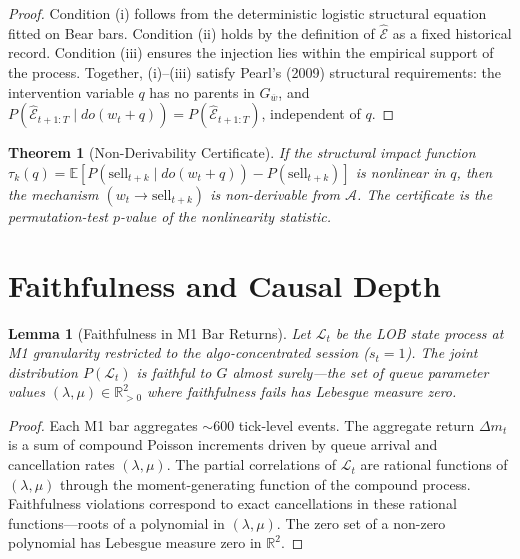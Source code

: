\documentclass[12pt]{article}
\newtheorem{theorem}{Theorem}
\newtheorem{lemma}{Lemma}
\begin{document}
\begin{proof}
Condition (i) follows from the deterministic logistic structural
equation fitted on Bear bars.
Condition (ii) holds by the definition of $\hat{\mathcal{E}}$ as a
fixed historical record.
Condition (iii) ensures the injection lies within the empirical
support of the process.
Together, (i)--(iii) satisfy Pearl's (2009) structural requirements:
the intervention variable $q$ has no parents in $G_{\overline{w}}$,
and $P(\hat{\mathcal{E}}_{t+1:T} \mid do(w_t + q)) =
P(\hat{\mathcal{E}}_{t+1:T})$, independent of $q$.
\end{proof}

\begin{theorem}[Non-Derivability Certificate]
\label{thm:certificate}
If the structural impact function
$\tau_k(q) = \mathbb{E}[P(\text{sell}_{t+k} \mid do(w_t + q))
- P(\text{sell}_{t+k})]$
is nonlinear in $q$, then the mechanism
$(w_t \to \text{sell}_{t+k})$ is non-derivable from $\mathcal{A}$.
The certificate is the permutation-test $p$-value of the
nonlinearity statistic.
\end{theorem}

\section{Faithfulness and Causal Depth}
\label{sec:faithfulness}

\begin{lemma}[Faithfulness in M1 Bar Returns]
\label{lem:faithfulness}
Let $\mathcal{L}_t$ be the LOB state process at M1 granularity
restricted to the algo-concentrated session ($s_t = 1$).
The joint distribution $P(\mathcal{L}_t)$ is faithful to $G$
almost surely---the set of queue parameter values
$(\lambda, \mu) \in \mathbb{R}^2_{>0}$ where faithfulness fails
has Lebesgue measure zero.
\end{lemma}

\begin{proof}
Each M1 bar aggregates $\sim$600 tick-level events.
The aggregate return $\Delta m_t$ is a sum of compound Poisson
increments driven by queue arrival and cancellation rates
$(\lambda, \mu)$.
The partial correlations of $\mathcal{L}_t$ are rational functions
of $(\lambda, \mu)$ through the moment-generating function of the
compound process.
Faithfulness violations correspond to exact cancellations in these
rational functions---roots of a polynomial in $(\lambda, \mu)$.
The zero set of a non-zero polynomial has Lebesgue measure zero
in $\mathbb{R}^2$.
\end{proof}
\end{document}
